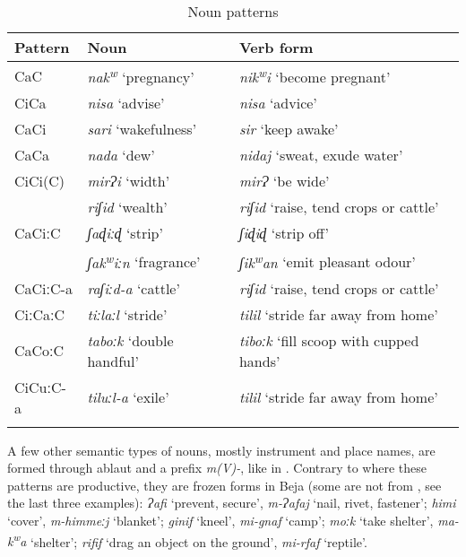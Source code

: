 \documentclass[output=paper]{langsci/langscibook}
\begin{document}
\begin{table}
\begin{tabularx}{.95\textwidth}{llX}
\lsptoprule
Pattern & Noun & Verb form\\
\midrule
CaC & \textit{nak\textsuperscript{w}} ‘pregnancy’ & \textit{nik\textsuperscript{w}}\textit{i} ‘become pregnant’\\
CiCa & \textit{nisa} ‘advise’ & \textit{nisa} ‘advice’\\
CaCi & \textit{sari} ‘wakefulness’ & \textit{sir} ‘keep awake’\\
CaCa & \textit{nada} ‘dew’ & \textit{nidaj} ‘sweat, exude water’\\
CiCi(C) & \textit{mirɁi} ‘width’ & \textit{mirɁ} ‘be wide’\\
& \textit{riʃid} ‘wealth’ & \textit{riʃid} ‘raise, tend crops or cattle’\\
CaCiːC & \textit{ʃaɖiːɖ} ‘strip’ & \textit{ʃiɖiɖ} ‘strip off’\\
& \textit{ʃak\textsuperscript{w}}\textit{iːn} ‘fragrance’ & \textit{ʃik\textsuperscript{w}}\textit{an} ‘emit pleasant odour’\\
CaCiːC-a & \textit{raʃiːd-a} ‘cattle’ & \textit{riʃid} ‘raise, tend crops or cattle’\\
CiːCaːC & \textit{tiːlaːl} ‘stride’ & \textit{tilil} ‘stride far away from home’\\
CaCoːC & \textit{taboːk} ‘double handful’ & \textit{tiboːk} ‘fill scoop with cupped hands’\\
CiCuːC-a & \textit{tiluːl-a} ‘exile’ & \textit{tilil} ‘stride far away from home’\\
\lspbottomrule
\end{tabularx} 
\caption{Noun patterns}
\label{tab:vanhove:nounpat}
\end{table}


 
 
 
\pagebreak{}

A few other semantic types of nouns, mostly instrument and place names, are formed through ablaut and a prefix \textit{m(V)-}, like in . Contrary to  where these patterns are productive, they are frozen forms in Beja (some are not  from , see the last three examples): \textit{Ɂafi} ‘prevent, secure’, \textit{m\nobreakdash-Ɂafaj} ‘nail, rivet, fastener’; \textit{himi} ‘cover’, \textit{m-himmeːj} ‘blanket’; \textit{ginif} ‘kneel’, \textit{mi-gnaf} ‘camp’; \textit{moːk} ‘take shelter’, \textit{ma\nobreakdash-k\textsuperscript{w}}\textit{a} ‘shelter’; \textit{rifif} ‘drag an object on the ground’, \textit{mi-rfaf} ‘reptile’.
\end{document}
